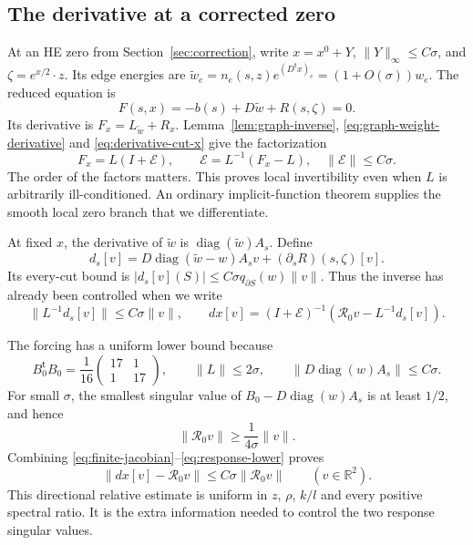 \documentclass[11pt]{amsart}
\theoremstyle{definition}
\theoremstyle{remark}
\newcommand{\RR}{\mathbb R}
\newcommand{\diag}{\operatorname{diag}}
\newcommand{\cR}{\mathcal R}
\begin{document}
\subsection{The derivative at a corrected zero}
At an HE zero from Section~\ref{sec:correction}, write
$x=x^0+Y$, $\|Y\|_\infty\le C\sigma$, and
$\zeta=e^{x/2}\cdot z$. Its edge energies are
$\widetilde w_e=n_e(s,z)e^{(D^{\mathsf t}x)_e}=(1+O(\sigma))w_e$.
The reduced equation is
\begin{equation}\label{eq:corrected-finite}
 F(s,x)=-b(s)+D\widetilde w+R(s,\zeta)=0.
\end{equation}
Its derivative is $F_x=L_{\widetilde w}+R_x$.
Lemma~\ref{lem:graph-inverse}, \eqref{eq:graph-weight-derivative} and
\eqref{eq:derivative-cut-x} give the factorization
\begin{equation}\label{eq:finite-jacobian}
 F_x=L(I+\mathcal E),\qquad
 \mathcal E=L^{-1}(F_x-L),\quad \|\mathcal E\|\le C\sigma.
\end{equation}
The order of the factors matters. This proves local invertibility even
when $L$ is arbitrarily ill-conditioned. An ordinary implicit-function
theorem supplies the smooth local zero branch that we differentiate.

At fixed $x$, the derivative of $\widetilde w$ is
$\diag(\widetilde w)A_s$. Define
\[
 d_s[v]=D\diag(\widetilde w-w)A_s v+(\partial_sR)(s,\zeta)[v].
\]
Its every-cut bound is $|d_s[v](S)|\le C\sigma q_{\partial S}(w)\|v\|$.
Thus the inverse has already been controlled when we write
\begin{equation}\label{eq:forcing-correction}
 \|L^{-1}d_s[v]\|\le C\sigma\|v\|,
 \qquad
 dx[v]=(I+\mathcal E)^{-1}(\cR_0v-L^{-1}d_s[v]).
\end{equation}

The forcing has a uniform lower bound because
\begin{equation}\label{eq:forcing-gram}
 B_0^{\mathsf t}B_0=\frac1{16}\begin{pmatrix}17&1\\1&17\end{pmatrix},
 \qquad \|L\|\le2\sigma,\qquad
 \|D\diag(w)A_s\|\le C\sigma.
\end{equation}
For small $\sigma$, the smallest singular value of
$B_0-D\diag(w)A_s$ is at least $1/2$, and hence
\begin{equation}\label{eq:response-lower}
 \|\cR_0v\|\ge\frac1{4\sigma}\|v\|.
\end{equation}
Combining \eqref{eq:finite-jacobian}--\eqref{eq:response-lower} proves
\begin{equation}\label{eq:finite-directional}
 \|dx[v]-\cR_0v\|\le C\sigma\|\cR_0v\|
 \qquad(v\in\RR^2).
\end{equation}
This directional relative estimate is uniform in $z$, $\rho$, $k/l$
and every positive spectral ratio. It is the extra information needed
to control the two response singular values.
\end{document}
